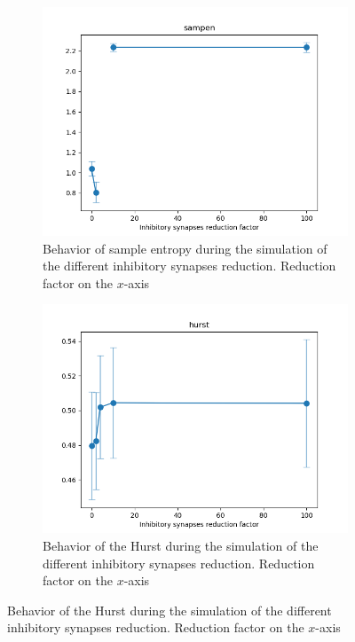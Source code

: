 \begin{figure}
  \begin{subfigure}[t]{0.48\textwidth}
    \centering
    \includegraphics[width=\textwidth]{sampen_evolution}
    \caption{Behavior of sample entropy during the simulation of the different inhibitory synapses reduction. Reduction factor on the $x$-axis}
    \label{fig:sampen-evolution}
  \end{subfigure}
  \begin{subfigure}[t]{0.48\textwidth}
    \centering
    \includegraphics[width=\textwidth]{hurst_rs_evolution}
    \caption{Behavior of the Hurst during the simulation of the different inhibitory synapses reduction. Reduction factor on the $x$-axis}
    \label{fig:hurst-evolution}

\end{subfigure}
\end{figure}
